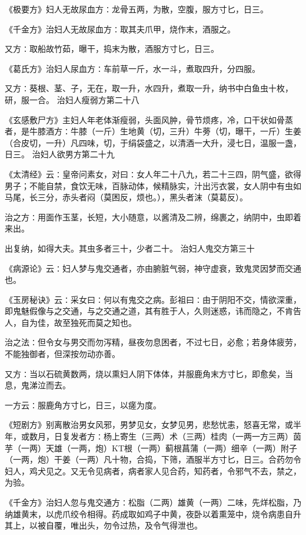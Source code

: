 \documentclass[a4paper,12pt,UTF8,twoside]{ctexbook}
\begin{document}
《极要方》妇人无故尿血方∶龙骨五两，为散，空腹，服方寸匕，日三。

《千金方》治妇人无故尿血方∶取其夫爪甲，烧作末，酒服之。

又方∶取船故竹茹，曝干，捣末为散，酒服方寸匕，日三。

《葛氏方》治妇人尿血方∶车前草一斤，水一斗，煮取四升，分四服。

又方∶葵根、茎、子，无在，取一升，水四升，煮取一升，纳书中白鱼虫十枚，研，服一合。
治妇人瘦弱方第二十八

《玄感敷尸方》主妇人年老体渐瘦弱，头面风肿，骨节烦疼，冷，口干状如骨蒸者，是牛膝酒方∶牛膝（一斤）生地黄（切，三升）牛蒡（切，曝干，一斤）生姜（合皮切，一升）凡四味，切，于绢袋盛之，以清酒一大升，浸七日，温服一盏，日三。
治妇人欲男方第二十九

《太清经》云∶皇帝问素女，对曰∶女人年二十八九，若二十三四，阴气盛，欲得男子；不能自禁，食饮无味，百脉动体，候精脉实，汁出污衣裳，女人阴中有虫如马尾，长三分，赤头者闷（莫困反，烦也。），黑头者沫（莫葛反）。

治之方∶用面作玉茎，长短，大小随意，以酱清及二辨，绵裹之，纳阴中，虫即着来出。

出复纳，如得大夫。其虫多者三十，少者二十。
治妇人鬼交方第三十

《病源论》云∶妇人梦与鬼交通者，亦由腑脏气弱，神守虚衰，致鬼灵因梦而交通也。

《玉房秘诀》云∶采女曰∶何以有鬼交之病。彭祖曰∶由于阴阳不交，情欲深重，即鬼魅假像与之交通，与之交通之道，其有胜于人，久则迷惑，讳而隐之，不肯告人，自为佳，故至独死而莫之知也。

治之法∶但令女与男交而勿泻精，昼夜勿息困者，不过七日，必愈；若身体疲劳，不能独御者，但深按勿动亦善。

又方∶当以石硫黄数两，烧以熏妇人阴下体体，并服鹿角末方寸匕，即愈矣，当息，鬼涕泣而去。

一方云∶服鹿角方寸匕，日三，以瘥为度。

《短剧方》别离散治男女风邪，男梦见女，女梦见男，悲愁忧恚，怒喜无常，或半年，或数月，日复发者方∶杨上寄生（三两）术（三两）桂肉（一两一方三两）茵芋（一两）天雄（一两，炮）KT根（一两）蓟根菖蒲（一两）细辛（一两）附子（一两，炮）干姜（一两）凡十物，合捣，下筛，酒服半方寸匕，日三。合药勿令妇人，鸡犬见之。又无令见病者，病者家人见合药，知药者，令邪气不去，禁之，为验。

《千金方》治妇人忽与鬼交通方∶松脂（二两）雄黄（一两）二味，先烊松脂，乃纳雄黄末，以虎爪绞令相得。药成取如鸡子中黄，夜卧以着熏笼中，烧令病患自升其上，以被自覆，唯出头，勿令过热，及令气得泄也。
\end{document}
